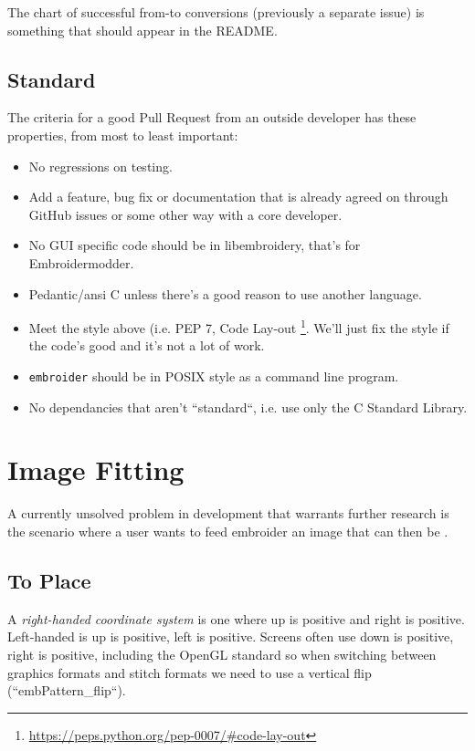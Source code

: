 \documentclass[a4paper]{report}
\begin{document}
The chart of successful from-to conversions (previously a separate issue)
is something that should appear in the README.

\subsection{Standard}

The criteria for a good Pull Request from an outside developer has these properties, from most to least important:

\begin{itemize}
\item No regressions on testing.
\item Add a feature, bug fix or documentation that is already agreed on through
    GitHub issues or some other way with a core developer.
\item No GUI specific code should be in libembroidery, that's for Embroidermodder.
\item Pedantic/ansi C unless there's a good reason to use another language.
\item Meet the style above (i.e.  PEP 7, Code Lay-out
    \footnote{\url{https://peps.python.org/pep-0007/#code-lay-out}}.
    We'll just fix the style if the code's good and it's not a lot of work.
\item \texttt{embroider} should be in POSIX style as a command line program.
\item No dependancies that aren't ``standard``, i.e. use only the C Standard Library.
\end{itemize}
\fi

\section{Image Fitting}

A currently unsolved problem in development that warrants further research is
the scenario where a user wants to feed embroider an image that can then be .

\subsection{To Place}

A \emph{right-handed coordinate system}
is one where up is positive and right is
positive. Left-handed is up is positive, left is positive. Screens often use
down is positive, right is positive, including the OpenGL standard so when
switching between graphics formats and stitch formats we need to use a vertical
flip (``embPattern\_flip``).
\end{document}
